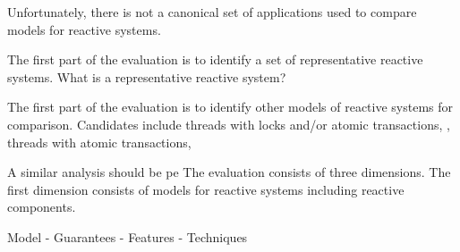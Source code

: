\documentclass[letterpaper]{article}
\begin{document}
Unfortunately, there is not a canonical set of applications used to compare models for reactive systems.




The first part of the evaluation is to identify a set of representative reactive systems.
What is a representative reactive system?



The first part of the evaluation is to identify other models of reactive systems for comparison.
Candidates include threads with locks and/or atomic transactions, , threads with atomic transactions, 

A similar analysis should be pe
The evaluation consists of three dimensions.
The first dimension consists of models for reactive systems including reactive components.



Model
  - Guarantees
  - Features
  - Techniques












{}
\end{document}
